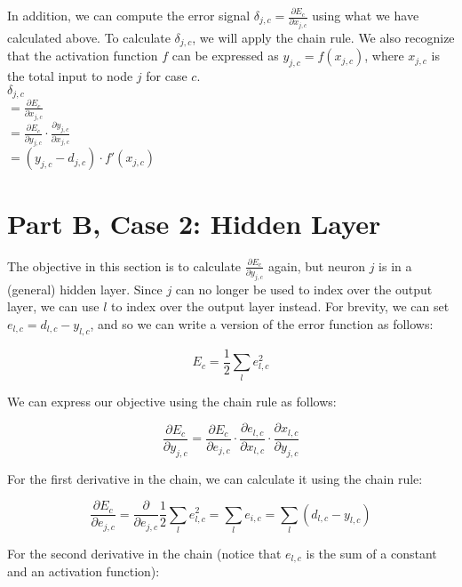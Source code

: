 \documentclass[conference]{IEEEtran}
\newcommand{\dd}[2]{\frac{\partial #1}{\partial #2}} %
\begin{document}
In addition, we can compute the error signal $\delta_{j, c} = \dd{E_{c}}{x_{j,c}}$ using what we have calculated above. To calculate $\delta_{j,c}$, we will apply the chain rule. We also recognize that the activation function $f$ can be expressed as $y_{j, c} = f(x_{j, c})$, where $x_{j, c}$ is the total input to node $j$ for case $c$. \\

$\delta_{j, c}$ \\

$= \dd{E_{c}}{x_{j,c}}$ \\

$= \dd{E_{c}}{y_{j,c}} \cdot \dd{y_{j,c}}{x_{j,c}}$ \\

$= (y_{j,c} - d_{j,c}) \cdot f'(x_{j,c})$ \\


\section{Part B, Case 2: Hidden Layer}

The objective in this section is to calculate $\dd{E_{c}}{y_{j, c}}$ again, but neuron $j$ is in a (general) hidden layer. Since $j$ can no longer be used to index over the output layer, we can use $l$ to index over the output layer instead. For brevity, we can set $e_{l, c} = d_{l, c} - y_{l, c}$, and so we can write a version of the error function as follows:

\begin{equation}
E_{c} = \frac{1}{2}\sum_{l}e_{l, c}^{2}
\end{equation}

We can express our objective using the chain rule as follows:

\begin{equation}
\dd{E_{c}}{y_{j, c}} = \dd{E_{c}}{e_{j, c}} \cdot \dd{e_{l, c}}{x_{l, c}} \cdot \dd{x_{l, c}}{y_{j, c}}
\end{equation}

For the first derivative in the chain, we can calculate it using the chain rule:

\begin{equation}
\dd{E_{c}}{e_{j, c}} = \dd{}{e_{j, c}} \frac{1}{2}\sum_{l}e_{l, c}^{2} = \sum_{l}e_{i, c} = \sum_{l}(d_{l,c} - y_{l,c})
\end{equation}

For the second derivative in the chain (notice that $e_{l, c}$ is the sum of a constant and an activation function):
\end{document}
